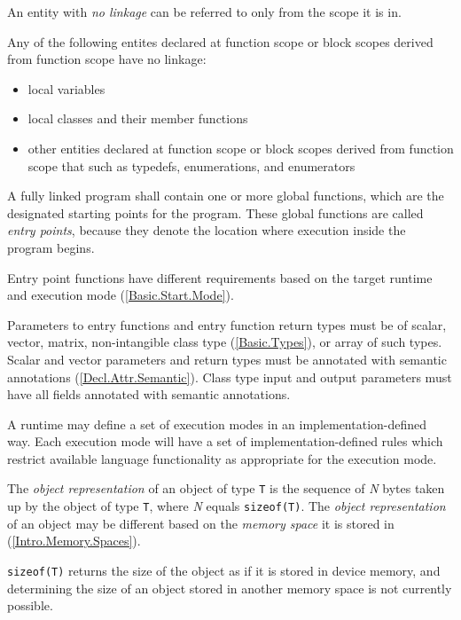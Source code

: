 
\p An entity with \textit{no linkage} can be referred to only from the scope it
is in.

\p Any of the following entites declared at function scope or block scopes
derived from function scope have no linkage:
\begin{itemize}
  \item local variables
  \item local classes and their member functions
  \item other entities declared at function scope or block scopes derived from
  function scope that such as typedefs, enumerations, and enumerators
\end{itemize}


\p A fully linked program shall contain one or more global functions, which are
the designated starting points for the program. These global functions are
called \textit{entry points}, because they denote the location where execution
inside the program begins.

\p Entry point functions have different requirements based on the target runtime
and execution mode (\ref{Basic.Start.Mode}).

\p Parameters to entry functions and entry function return types must be of
scalar, vector, matrix, non-intangible class type (\ref{Basic.Types}), or array
of such types. Scalar and vector parameters and return types must be annotated
with semantic annotations (\ref{Decl.Attr.Semantic}). Class type input and
output parameters must have all fields annotated with semantic annotations.


\p A runtime may define a set of execution modes in an implementation-defined
way. Each execution mode will have a set of implementation-defined rules which
restrict available language functionality as appropriate for the execution mode.


\p The \textit{object representation} of an object of type \texttt{T} is the
sequence of \textit{N} bytes taken up by the object of type \texttt{T}, where
\textit{N} equals \texttt{sizeof(T)}. The \textit{object representation} of an
object may be different based on the \textit{memory space} it is stored in
(\ref{Intro.Memory.Spaces}).

\begin{note}
  \texttt{sizeof(T)} returns the size of the object as if it is stored in device
  memory, and determining the size of an object stored in another memory space
  is not currently possible.
\end{note}

